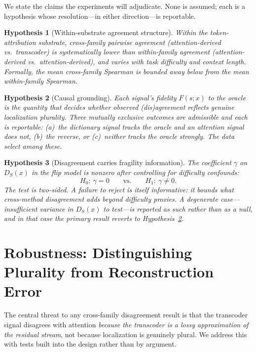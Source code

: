 \documentclass[11pt]{article}
\newtheorem{hypothesis}{Hypothesis}
\begin{document}
We state the claims the experiments will adjudicate. None is assumed; each is
a hypothesis whose resolution---in either direction---is reportable.

\begin{hypothesis}[Within-substrate agreement structure]
\label{hyp:agreement}
Within the token-attribution substrate, cross-family pairwise agreement
(attention-derived vs.\ transcoder) is systematically lower than
within-family agreement (attention-derived vs.\ attention-derived), and
varies with task difficulty and context length. Formally, the mean
cross-family Spearman is bounded away below from the mean within-family
Spearman.
\end{hypothesis}

\begin{hypothesis}[Causal grounding]
\label{hyp:fidelity}
Each signal's fidelity $F(s;x)$ to the oracle is the quantity that decides
whether observed (dis)agreement reflects genuine localization plurality.
Three mutually exclusive outcomes are admissible and each is reportable:
(a)~the dictionary signal tracks the oracle and an attention signal does not,
(b)~the reverse, or (c)~neither tracks the oracle strongly. The data select
among these.
\end{hypothesis}

\begin{hypothesis}[Disagreement carries fragility information]
\label{hyp:fragility}
The coefficient $\gamma$ on $D_S(x)$ in the flip model is nonzero after
controlling for difficulty confounds:
\[
  H_0\!:\ \gamma = 0
  \qquad\text{vs.}\qquad
  H_1\!:\ \gamma \ne 0 .
\]
The test is two-sided. A failure to reject is itself informative: it bounds
what cross-method disagreement adds beyond difficulty proxies. A degenerate
case---insufficient variance in $D_S(x)$ to test---is reported as such rather
than as a null, and in that case the primary result reverts to
Hypothesis~\ref{hyp:fidelity}.
\end{hypothesis}

\section{Robustness: Distinguishing Plurality from Reconstruction Error}
\label{sec:robustness}

The central threat to any cross-family disagreement result is that the
transcoder signal disagrees with attention \emph{because the transcoder is a
lossy approximation of the residual stream}, not because localization is
genuinely plural. We address this with tests built into the design rather
than by argument.
\end{document}
